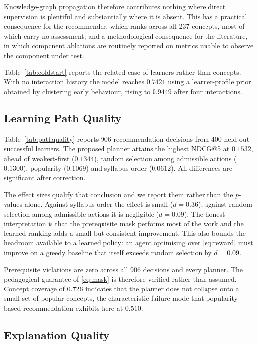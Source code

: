 \documentclass[conference]{IEEEtran}
\begin{document}
Knowledge-graph propagation therefore contributes nothing where direct supervision is
plentiful and substantially where it is absent. This has a practical consequence for the
recommender, which ranks across all 237 concepts, most of which carry no assessment; and
a methodological consequence for the literature, in which component ablations are
routinely reported on metrics unable to observe the component under test.

Table~\ref{tab:coldstart} reports the related case of learners rather than concepts. With
no interaction history the model reaches $0.7421$ using a learner-profile prior obtained
by clustering early behaviour, rising to $0.9449$ after four interactions.

\subsection{Learning Path Quality}

Table~\ref{tab:pathquality} reports 906 recommendation decisions from 400 held-out
successful learners. The proposed planner attains the highest NDCG@5 at $0.1532$, ahead
of weakest-first ($0.1344$), random selection among admissible actions ($0.1300$),
popularity ($0.1069$) and syllabus order ($0.0612$). All differences are significant
after correction.

The effect sizes qualify that conclusion and we report them rather than the $p$-values
alone. Against syllabus order the effect is small ($d = 0.36$); against random selection
among admissible actions it is negligible ($d = 0.09$). The honest interpretation is that
the prerequisite mask performs most of the work and the learned ranking adds a small but
consistent improvement. This also bounds the headroom available to a learned policy: an
agent optimising over \eqref{eq:reward} must improve on a greedy baseline that itself
exceeds random selection by $d = 0.09$.

Prerequisite violations are zero across all 906 decisions and every planner. The
pedagogical guarantee of \eqref{eq:mask} is therefore verified rather than assumed.
Concept coverage of $0.726$ indicates that the planner does not collapse onto a small
set of popular concepts, the characteristic failure mode that popularity-based
recommendation exhibits here at $0.510$.

\subsection{Explanation Quality}
\end{document}
